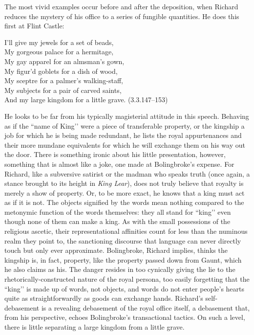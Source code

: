 The most vivid examples occur before and after the deposition, when Richard reduces the mystery of his office to a series of fungible quantities.
He does this first at Flint Castle:
\begin{vq}
I’ll give my jewels for a set of beads, \\
My gorgeous palace for a hermitage, \\
My gay apparel for an almsman’s gown, \\
My figur’d goblets for a dish of wood, \\
My sceptre for a palmer’s walking-staff, \\
My subjects for a pair of carved saints, \\
And my large kingdom for a little grave. (3.3.147--153)
\end{vq}
He looks to be far from his typically magisterial attitude in this speech.
Behaving as if the ``name of King’’ were a piece of transferable property, or the kingship a job for which he is being made redundant, he lists the royal appurtenances and their more mundane equivalents for which he will exchange them on his way out the door.
There is something ironic about his little presentation, however, something that is almost like a joke, one made at Bolingbroke’s expense.
For Richard, like a subversive satirist or the madman who speaks truth (once again, a stance brought to its height in \emph{King Lear}), does not truly believe that royalty is merely a show of property.
Or, to be more exact, he knows that a king must act as if it is not.
The objects signified by the words mean nothing compared to the metonymic function of the words themselves: they all stand for ``king’’ even though none of them can make a king.
As with the small possessions of the religious ascetic, their representational affinities count for less than the numinous realm they point to, the sanctioning discourse that language can never directly touch but only ever approximate.
Bolingbroke, Richard implies, thinks the kingship is, in fact, property, like the property passed down from Gaunt, which he also claims as his.
The danger resides in too cynically giving the lie to the rhetorically-constructed nature of the royal persona, too easily forgetting that the ``king’’ is made up of words, not objects, and words do not enter people’s hearts quite as straightforwardly as goods can exchange hands.
Richard’s self-debasement is a revealing debasement of the royal office itself, a debasement that, from his perspective, echoes Bolingbroke’s transactional tactics.
On such a level, there is little separating a large kingdom from a little grave.


